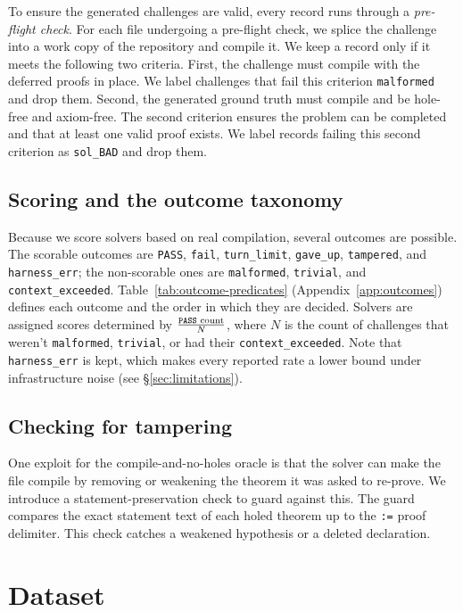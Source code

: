 \documentclass{article}
\begin{document}
To ensure the generated challenges are valid, every record runs through a \emph{pre-flight check}. For each file undergoing a pre-flight check, we splice the challenge into a work copy of the repository and compile it. We keep a record only if it meets the following two criteria. First, the challenge must compile with the deferred proofs in place. We label challenges that fail this criterion \texttt{malformed} and drop them. Second, the generated ground truth must compile and be hole-free and axiom-free. The second criterion ensures the problem can be completed and that at least one valid proof exists. We label records failing this second criterion as \texttt{sol\_BAD} and drop them.

\subsection{Scoring and the outcome taxonomy}
\label{sec:outcomes}

Because we score solvers based on real compilation, several outcomes are possible. The scorable outcomes are \texttt{PASS}, \texttt{fail}, \texttt{turn\_limit}, \texttt{gave\_up}, \texttt{tampered}, and \texttt{harness\_err}; the non-scorable ones are \texttt{malformed}, \texttt{trivial}, and \texttt{context\_exceeded}. Table~\ref{tab:outcome-predicates} (Appendix~\ref{app:outcomes}) defines each outcome and the order in which they are decided. Solvers are assigned scores determined by \(\frac{\text{\texttt{PASS} count}}{N}\), where \(N\) is the count of challenges that weren’t \texttt{malformed}, \texttt{trivial}, or had their \texttt{context\_exceeded}. Note that \texttt{harness\_err} is kept, which makes every reported rate a lower bound under infrastructure noise (see \S\ref{sec:limitations}).

\subsection{Checking for tampering}
\label{sec:tampercheck}

One exploit for the compile-and-no-holes oracle is that the solver can make the file compile by removing or weakening the theorem it was asked to re-prove. We introduce a statement-preservation check to guard against this. The guard compares the exact statement text of each holed theorem up to the \texttt{:=} proof delimiter. This check catches a weakened hypothesis or a deleted declaration.

\section{Dataset}
\label{sec:dataset}
\end{document}
